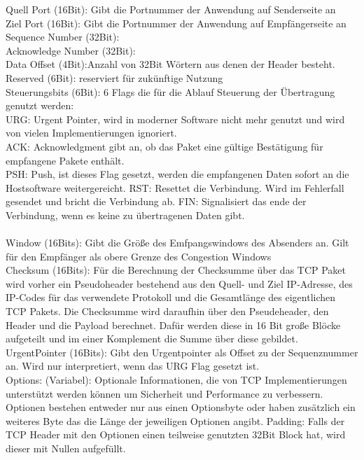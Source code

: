 Quell Port (16Bit): Gibt die Portnummer der Anwendung auf Senderseite an \\
Ziel Port (16Bit): Gibt die Portnummer der Anwendung auf Empfängerseite an\\
Sequence Number (32Bit):  \\
Acknowledge Number (32Bit): \\
Data Offset (4Bit):Anzahl von 32Bit Wörtern aus denen der Header besteht. \\
Reserved (6Bit): reserviert für zukünftige Nutzung\\
Steuerungsbits (6Bit): 6 Flags die für die Ablauf Steuerung der Übertragung genutzt werden: \\
	URG: Urgent Pointer, wird in moderner Software nicht mehr genutzt und wird von vielen Implementierungen ignoriert. \\
	ACK: Acknowledgment gibt an, ob das Paket eine gültige Bestätigung für empfangene Pakete enthält.\\
	PSH: Push, ist dieses Flag gesetzt, werden die empfangenen Daten sofort an die Hostsoftware weitergereicht. 
	RST: Resettet die Verbindung. Wird im Fehlerfall gesendet und bricht die Verbindung ab. 
	FIN: Signalisiert das ende der Verbindung, wenn es keine zu übertragenen Daten gibt. \\\\
Window (16Bits): Gibt die Größe des Emfpangswindows des Absenders an. Gilt für den Empfänger als obere Grenze des Congestion Windows\\
Checksum (16Bits): Für die Berechnung der Checksumme über das TCP Paket wird vorher ein Pseudoheader bestehend aus den Quell- und Ziel IP-Adresse, des IP-Codes für das verwendete Protokoll und die Gesamtlänge des eigentlichen TCP Pakets. Die Checksumme wird daraufhin über den Pseudeheader, den Header und die Payload berechnet. Dafür werden diese in 16 Bit große Blöcke aufgeteilt und im einer Komplement die Summe über diese gebildet. \\
UrgentPointer (16Bits): Gibt den Urgentpointer als Offset zu der Sequenznummer an. Wird nur interpretiert, wenn das URG Flag gesetzt ist.\\ 
Options: (Variabel):  Optionale Informationen, die von TCP Implementierungen unterstützt werden können um Sicherheit und Performance zu verbessern. Optionen bestehen entweder nur aus einen Optionsbyte oder haben zusätzlich ein weiteres Byte das die Länge der jeweiligen Optionen angibt. 
Padding: Falls der TCP Header mit den Optionen einen teilweise genutzten 32Bit Block hat, wird dieser mit Nullen aufgefüllt. 


